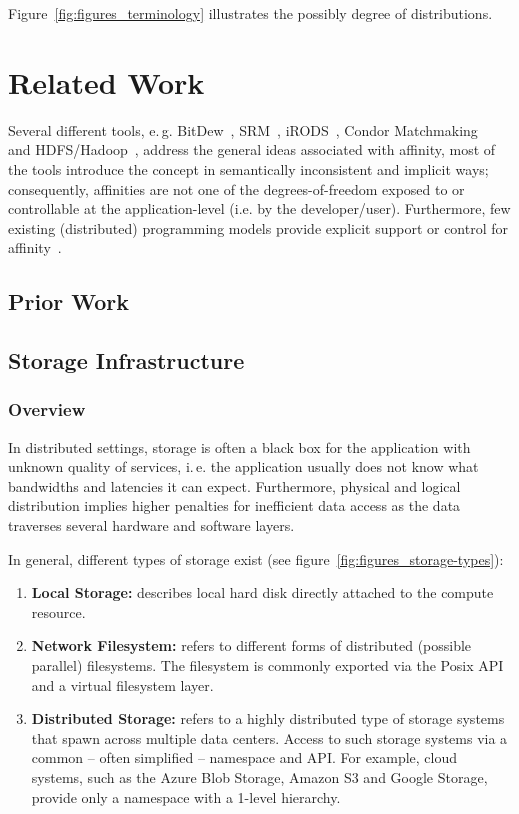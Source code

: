 \documentclass[conference]{IEEEtran}
\begin{document}
Figure~\ref{fig:figures_terminology} illustrates the possibly degree of 
distributions.


\section{Related Work}
Several different tools, e.\,g.
BitDew~\cite{Fedak:2008:BPE:1413370.1413416}, SRM~\cite{srm-ogf},
iRODS~\cite{Rajasekar:2010:IPI:1855046}, Condor
Matchmaking~\cite{Raman:1998:MDR:822083.823222} and
HDFS/Hadoop~\cite{hadoop}, address the general ideas associated with
affinity, most of the tools introduce the concept in semantically
inconsistent and implicit ways; consequently, affinities are not one
of the degrees-of-freedom exposed to or controllable at the
application-level (i.e.  by the developer/user). Furthermore, few
existing (distributed) programming models provide explicit support or
control for affinity~\cite{ideas}.

\subsection{Prior Work}

\subsection{Storage Infrastructure}


\subsubsection*{Overview}
In distributed settings, storage is often a black box for the application with
unknown quality of services, i.\,e. the application usually does not know what
bandwidths and latencies it can expect. Furthermore, physical and logical
distribution implies higher penalties for inefficient data access as the data
traverses several hardware and software layers.


In general, different types of storage exist (see 
figure~\ref{fig:figures_storage-types}):

\begin{enumerate}
	\item \textbf{Local Storage:} describes local hard disk directly attached 
	to the compute resource.
	\item \textbf{Network Filesystem:} refers to different forms of 
	distributed (possible parallel) filesystems. The filesystem is commonly 
	exported via the Posix API and a virtual filesystem layer.
	\item \textbf{Distributed Storage:} refers to a highly distributed type of 
	storage systems that spawn across multiple data centers. Access to such 
	storage systems via a common -- often simplified -- namespace and API. For 
	example, cloud systems, such as the Azure Blob Storage, Amazon S3 and 
	Google Storage, provide only a namespace with a 1-level hierarchy. 
\end{enumerate}
\end{document}
